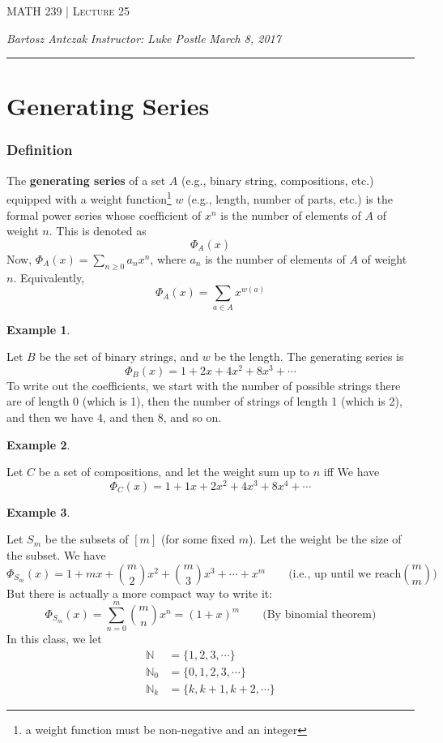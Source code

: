 \documentclass{report}
\newcommand{\lectureNum}{25}
\newcommand{\curDate}{March 8, 2017}
\newcommand{\course}{MATH 239}
\newcommand{\instructor}{Luke Postle}
\newtheorem{ex}{Example}[section]
\begin{document}
\begin{center}
\begin{Large}
\textsc{\course{} | Lecture \lectureNum{}}
\end{Large}
\end{center} 
\noindent \textit{Bartosz Antczak} \hfill
\textit{Instructor: \instructor{}} \hfill
\textit{\curDate{}}
\rule{\textwidth}{0.4pt}
\section{Generating Series}
\subsubsection{Definition}
The \textbf{generating series} of a set $A$ (e.g., binary string, compositions, etc.) equipped with a weight function\footnote{a weight function must be non-negative and an integer} $w$ (e.g., length, number of parts, etc.) is the formal power series whose coefficient of $x^n$ is the number of elements of $A$ of weight $n$.
This is denoted as
$$\Phi_A (x)$$
Now, $\Phi_A (x) = \displaystyle\sum_{n \geq 0} a_nx^n$, where $a_n$ is the number of elements of $A$ of weight $n$. Equivalently, $$\Phi_A (x) = \sum_{a \in A}x^{w(a)}$$
\begin{ex}
\end{ex}
Let $B$ be the set of binary strings, and $w$ be the length. The generating series is
$$\Phi_B (x) = 1 + 2x + 4x^2 + 8x^3 + \cdots$$
To write out the coefficients, we start with the number of possible strings there are of length 0 (which is 1), then the number of strings of length 1 (which is 2), and then we have 4, and then 8, and so on.
\begin{ex}
\end{ex}
Let $C$ be a set of compositions, and let the weight sum up to $n$ iff 
We have
$$\Phi_C(x) = 1 + 1x + 2x^2 + 4x^3 + 8x^4 + \cdots$$
\begin{ex}
\end{ex}
Let $S_m$ be the subsets of $[m]$ (for some fixed $m$). Let the weight be the size of the subset. We have
$$\Phi_{S_{m}} (x) =  1 + mx + {m \choose 2}x^2 + {m \choose 3}x^3 + \cdots + x^m \qquad \text{(i.e., up until we reach} {m \choose m})$$
But there is actually a more compact way to write it:
$$\Phi_{S_{m}}(x) = \sum_{n=0}^m {m \choose n}x^n = (1+x)^m \qquad\text{(By binomial theorem)}$$
In this class, we let
\begin{align*}
\mathbb{N} &= \{1, 2, 3, \cdots\} \\
\mathbb{N}_0 &= \{0, 1, 2, 3, \cdots\} \\
\mathbb{N}_k &= \{k, k+1, k+2, \cdots\}
\end{align*}
\end{document}
